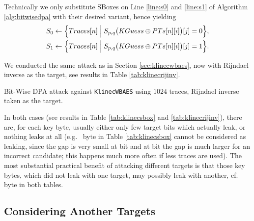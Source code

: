 \begin{remark}
	Technically we only substitute SBoxes on Line \ref{line:s0} and \ref{line:s1} of Algorithm \ref{alg:bitwisedpa} with their desired variant, hence yielding
	\begin{align*}
		S_0 &\gets \Bigl\{ Traces[n] \Bigm| S_{p,q}\bigl(KGuess\oplus PTs[n][i]\bigr)[j] = 0 \Bigr\} , \\
		S_1 &\gets \Bigl\{ Traces[n] \Bigm| S_{p,q}\bigl(KGuess\oplus PTs[n][i]\bigr)[j] = 1 \Bigr\} .
	\end{align*}
\end{remark}

We conducted the same attack as in Section \ref{sec:klinecwbaes}, now with Rijndael inverse as the target, see results in Table \ref{tab:klinecrijinv}.

\begin{landscape}
\begin{table}[H]
	\begin{center}
	
	\end{center}
\caption{Bit-Wise DPA attack against {\tt KlinecWBAES} using $1024$ traces, Rijndael inverse taken as the target.}
\label{tab:klinecrijinv}
\end{table}
\end{landscape}

In both cases (see results in Table \ref{tab:klinecsbox} and \ref{tab:klinecrijinv}), there are, for each key byte, usually either only few target bits which actually leak, or nothing leaks at all (e.g.\  byte in Table \ref{tab:klinecsbox} cannot be considered as leaking, since the gap is very small at  bit and at  bit the gap is much larger for an incorrect candidate; this happens much more often if less traces are used). The most substantial practical benefit of attacking different targets is that those key bytes, which did not leak with one target, may possibly leak with another, cf.  byte in both tables.



\subsection{Considering Another Targets}
\label{sec:16targets}

